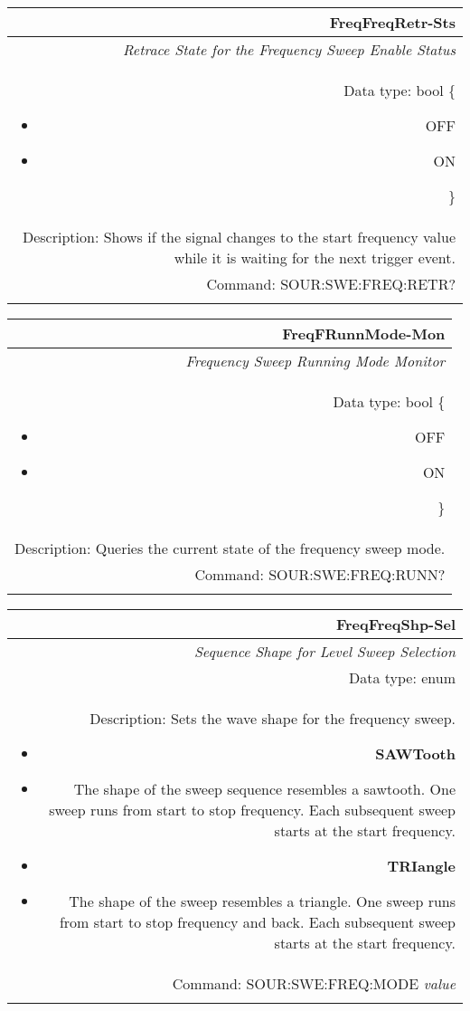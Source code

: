 \documentclass[openany]{article}
\begin{document}
		\begin{tabular}{N}
			\hline
			\bfseries FreqFreqRetr-Sts \\ \hline
			\emph{Retrace State for the Frequency Sweep Enable Status} \\
			Data type: bool \{\begin{itemize}[noitemsep]
				\small
				\item[] OFF
				\item[] ON
			\end{itemize}\} \\
			Description: Shows if the signal changes to the start frequency value while it is waiting for the next trigger event. \\
			Command: SOUR:SWE:FREQ:RETR? \\
			\\

		\end{tabular}


		\begin{tabular}{N}
			\hline
			\bfseries FreqFRunnMode-Mon \\ \hline
			\emph{Frequency Sweep Running Mode Monitor} \\
			Data type: bool \{\begin{itemize}[noitemsep]
				\small
				\item[] OFF
				\item[] ON
			\end{itemize}\} \\
			Description: Queries the current state of the frequency sweep mode. \\
			Command: SOUR:SWE:FREQ:RUNN? \\
			\\

		\end{tabular}


		\begin{tabular}{N}
			\hline
			\bfseries FreqFreqShp-Sel \\ \hline
			\emph{Sequence Shape for Level Sweep Selection} \\
			Data type: enum \\
			Description: Sets the wave shape for the frequency sweep.\begin{itemize}[noitemsep]
				\small
				\item[] \textbf{SAWTooth}
				\item[] The shape of the sweep sequence resembles a sawtooth. One sweep runs from start to stop frequency. Each subsequent sweep starts at the start frequency.
				\item[] \textbf{TRIangle}
				\item[] The shape of the sweep resembles a triangle. One sweep runs from start to stop frequency and back. Each subsequent sweep starts at the start frequency.
			\end{itemize} \\
			Command: SOUR:SWE:FREQ:MODE \emph{value} \\
			\\

		\end{tabular}
\end{document}
